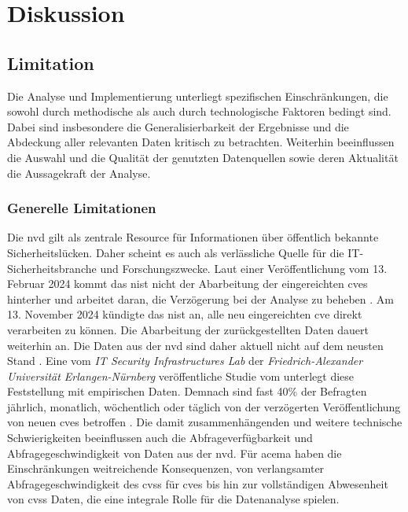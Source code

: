 \chapter{Diskussion}
\label{chap:diskussion}

\section{Limitation}
\label{sec:limitationen}
Die Analyse und Implementierung unterliegt spezifischen Einschränkungen, die sowohl durch methodische als auch durch technologische Faktoren bedingt sind. Dabei sind insbesondere die Generalisierbarkeit der Ergebnisse und die Abdeckung aller relevanten Daten kritisch zu betrachten.  Weiterhin beeinflussen die Auswahl und die Qualität der genutzten Datenquellen sowie deren Aktualität die Aussagekraft der Analyse. 
\subsection{Generelle Limitationen}
\label{limitation-generell}
\par Die \gls{nvd} gilt als zentrale Resource für Informationen über öffentlich bekannte Sicherheitslücken. Daher scheint es auch als verlässliche Quelle für die IT-Sicherheitsbranche und Forschungszwecke. Laut einer Veröffentlichung vom 13. Februar 2024 kommt das \gls{nist} nicht der Abarbeitung der eingereichten \glspl{cve} hinterher und arbeitet daran, die Verzögerung bei der Analyse zu beheben \autocite{NVDProgramAnnouncement}. Am 13. November 2024 kündigte das \gls{nist} an, alle neu eingereichten \gls{cve} direkt verarbeiten zu können. Die Abarbeitung der zurückgestellten Daten dauert weiterhin an. Die Daten aus der \gls{nvd} sind daher aktuell  nicht auf dem neusten Stand \autocite{NationalVulnerabilityDatabase2024}. Eine vom \textit{IT Security Infrastructures Lab} der \textit{Friedrich-Alexander Universität Erlangen-Nürnberg} veröffentliche Studie vom  unterlegt diese Feststellung mit empirischen Daten. Demnach sind fast 40\% der Befragten jährlich, monatlich, wöchentlich oder täglich von der verzögerten Veröffentlichung von neuen \glspl{cve} betroffen \autocite{wunderNVDUsersAttitudes2024}. Die damit zusammenhängenden und weitere technische Schwierigkeiten beeinflussen auch die Abfrageverfügbarkeit und Abfragegeschwindigkeit von Daten aus der \gls{nvd}. Für \gls{acema} haben die Einschränkungen weitreichende Konsequenzen, von verlangsamter Abfragegeschwindigkeit des \gls{cvss} für \glspl{cve} bis hin zur vollständigen Abwesenheit von \gls{cvss} Daten, die eine integrale Rolle für die Datenanalyse spielen.
%
